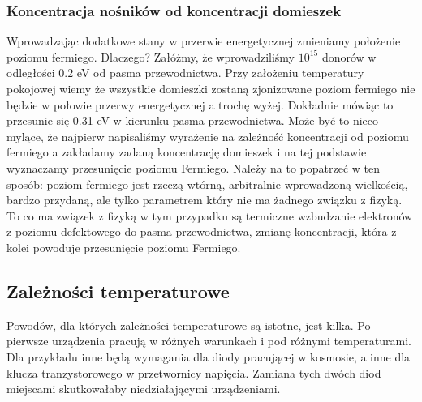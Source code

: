         \subsubsection{Koncentracja nośników od koncentracji domieszek}
            Wprowadzając dodatkowe stany w przerwie energetycznej zmieniamy położenie poziomu fermiego. Dlaczego? Załóżmy, że wprowadziliśmy $10^{15}$ donorów w odległości 
            0.2 eV od pasma przewodnictwa. Przy założeniu temperatury pokojowej wiemy że wszystkie domieszki zostaną zjonizowane poziom fermiego nie będzie w połowie przerwy energetycznej a trochę wyżej.
            Dokładnie mówiąc to przesunie się 0.31 eV w kierunku pasma przewodnictwa. Może być to nieco mylące, że najpierw napisaliśmy wyrażenie na zależność koncentracji od poziomu fermiego a 
            zakładamy zadaną koncentrację domieszek i na tej podstawie wyznaczamy przesunięcie poziomu Fermiego. Należy na to popatrzeć w ten sposób: poziom fermiego jest rzeczą 
            wtórną, arbitralnie wprowadzoną wielkością, bardzo przydaną, ale tylko parametrem który nie ma żadnego związku z fizyką. To co ma związek z fizyką w tym przypadku są
            termiczne wzbudzanie elektronów z poziomu defektowego do pasma przewodnictwa, zmianę koncentracji, która z kolei powoduje przesunięcie poziomu Fermiego. 

    \subsection{Zależności temperaturowe}
        Powodów, dla których zależności temperaturowe są istotne, jest kilka. Po pierwsze urządzenia pracują w różnych warunkach i pod różnymi temperaturami. 
        Dla przykładu inne będą wymagania dla diody pracującej w kosmosie, a inne dla klucza tranzystorowego w przetwornicy napięcia. Zamiana tych dwóch diod miejscami skutkowałaby niedziałającymi urządzeniami. 
